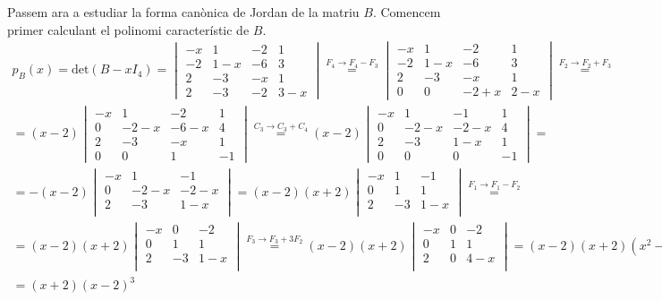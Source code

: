 \documentclass[11pt,a4paper]{article}
\begin{document}
        Passem ara a estudiar la forma canònica de Jordan de la matriu $B$. Comencem primer calculant el polinomi característic de $B$.
        \begin{multline*}
        p_B(x)=\text{det}(B-xI_4)=\begin{vmatrix}
        -x & 1 & -2 & 1\\
        -2 & 1-x & -6 & 3\\
        2 & -3 & -x & 1\\
        2 & -3 & -2 & 3-x
        \end{vmatrix}\stackrel{F_4\rightarrow F_4-F_3}{=}\begin{vmatrix}
        -x & 1 & -2 & 1\\
        -2 & 1-x & -6 & 3\\
        2 & -3 & -x & 1\\
        0 & 0 & -2+x & 2-x
        \end{vmatrix}\stackrel{F_2\rightarrow F_2+F_3}{=}\\=(x-2)\begin{vmatrix}
        -x & 1 & -2 & 1\\
        0 & -2-x & -6-x & 4\\
        2 & -3 & -x & 1\\
        0 & 0 & 1 & -1
        \end{vmatrix}\stackrel{C_3\rightarrow C_3+C_4}{=}(x-2)\begin{vmatrix}
        -x & 1 & -1 & 1\\
        0 & -2-x & -2-x & 4\\
        2 & -3 & 1-x & 1\\
        0 & 0 & 0 & -1
        \end{vmatrix}=\\=-(x-2)\begin{vmatrix}
        -x & 1 & -1\\
        0 & -2-x & -2-x\\
        2 & -3 & 1-x\\
        \end{vmatrix}=(x-2)(x+2)\begin{vmatrix}
        -x & 1 & -1\\
        0 & 1 & 1\\
        2 & -3 & 1-x\\
        \end{vmatrix}\stackrel{F_1\rightarrow F_1-F_2}{=}\\=(x-2)(x+2)\begin{vmatrix}
        -x & 0 & -2\\
        0 & 1 & 1\\
        2 & -3 & 1-x\\
        \end{vmatrix}\stackrel{F_3\rightarrow F_3+3F_2}{=}(x-2)(x+2)\begin{vmatrix}
        -x & 0 & -2\\
        0 & 1 & 1\\
        2 & 0 & 4-x\\
        \end{vmatrix}=(x-2)(x+2)(x^2-4x+4)=\\=(x+2)(x-2)^3
        \end{multline*}
\end{document}
